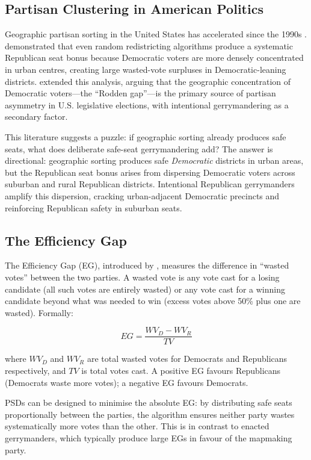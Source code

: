 \subsection{Partisan Clustering in American Politics}

Geographic partisan sorting in the United States has accelerated since the
1990s \citep{bishop2009bigSort, rodden2019why}.  \citet{chen2013unintentional}
demonstrated that even random redistricting algorithms produce a systematic
Republican seat bonus because Democratic voters are more densely concentrated
in urban centres, creating large wasted-vote surpluses in Democratic-leaning
districts.  \citet{rodden2019why} extended this analysis, arguing that the
geographic concentration of Democratic voters---the ``Rodden gap''---is the
primary source of partisan asymmetry in U.S. legislative elections, with
intentional gerrymandering as a secondary factor.

This literature suggests a puzzle: if geographic sorting already produces safe
seats, what does deliberate safe-seat gerrymandering add?  The answer is
directional: geographic sorting produces safe \emph{Democratic} districts in
urban areas, but the Republican seat bonus arises from dispersing Democratic
voters across suburban and rural Republican districts.  Intentional Republican
gerrymanders amplify this dispersion, cracking urban-adjacent Democratic
precincts and reinforcing Republican safety in suburban seats.

\subsection{The Efficiency Gap}

The Efficiency Gap (EG), introduced by \citet{stephanopoulos2015partisan},
measures the difference in ``wasted votes'' between the two parties.  A
wasted vote is any vote cast for a losing candidate (all such votes are
entirely wasted) or any vote cast for a winning candidate beyond what was
needed to win (excess votes above 50\% plus one are wasted).  Formally:

\begin{equation}
  EG = \frac{WV_D - WV_R}{TV}
\end{equation}

where $WV_D$ and $WV_R$ are total wasted votes for Democrats and Republicans
respectively, and $TV$ is total votes cast.  A positive EG favours Republicans
(Democrats waste more votes); a negative EG favours Democrats.

PSDs can be designed to minimise the absolute EG: by distributing safe seats
proportionally between the parties, the algorithm ensures neither party wastes
systematically more votes than the other.  This is in contrast to enacted
gerrymanders, which typically produce large EGs in favour of the mapmaking
party.

